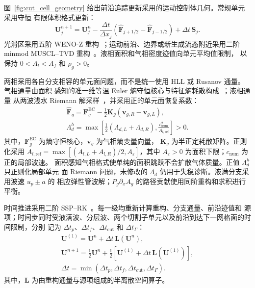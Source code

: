 图~\ref{fig:cut_cell_geometry} 给出前沿追踪更新采用的运动控制体几何。常规单元采用守恒
有限体积格式更新：
\begin{equation}
\mathbf U_j^{n+1}=\mathbf U_j^n
-\frac{\Delta t}{\Delta x_j}
\left(\widehat{\mathbf F}_{j+1/2}
-\widehat{\mathbf F}_{j-1/2}\right)
+\Delta t\,\mathbf S_j.
\label{eq:fv_update}
\end{equation}
光滑区采用五阶 WENO-Z 重构~\cite{borges2008}；运动前沿、边界或新生成流态附近采用二阶
minmod MUSCL--TVD 重构~\cite{vanleer1979}。液相面积和气相密度迹值向单元平均值限制，
以保持 $0<A_l<A_f$ 和 $\rho_g>0$。

两相采用各自分支相容的单元面问题，而不是统一使用 HLL 或 Rusanov 通量。气相通量由面积
感知的准一维等温 Euler 熵守恒核心与特征熵耗散构成~\cite{winters2020,chan2024}；液相通量
从两波浅水 Riemann 解采样~\cite{toro2001}，并采用正的单元面恢复系数：
\begin{equation}
\begin{gathered}
\widehat{\mathbf F}_g
=\mathbf F_g^{\mathrm{EC}}
-\tfrac12\mathbf K_g(\mathbf v_{g,R}-\mathbf v_{g,L}),\\[3pt]
\Lambda_{d}^{h}
=\max\!\left[
\tfrac12(\Lambda_{d,L}+\Lambda_{d,R}),
\frac{c_{\mathrm{num}}^2}{A_{l,\mathrm{ref}}}
\right]>0.
\end{gathered}
\label{eq:regular_fluxes}
\end{equation}
其中，$\mathbf F_g^{\mathrm{EC}}$ 为熵守恒核心，$\mathbf v_g$ 为气相熵变量向量，
$\mathbf K_g$ 为\mbox{半正定耗散矩阵}。正则化采用
$A_{l,\mathrm{ref}}=\max[(A_{l,L}+A_{l,R})/2,A_\varepsilon]$，其中
$A_\varepsilon>0$ 为面积下限；$c_{\mathrm{num}}$ 为正的局部波速。
\mbox{面积感知}气相格式使单纯的面积跳跃不会扩散气体质量。正值 $\Lambda_d^h$ 只正则化局部单元
面 Riemann 问题，未修改的 $\Lambda_d$ 仍用于失稳诊断。液满分支采用波速 $u_p\pm a$ 的
相应弹性管波解；$P_g\partial_xA_g$ 的路径贡献使用同阶重构和求积进行平衡。

时间推进采用二阶 SSP--RK~\cite{gottlieb2001}。每一级均重新计算重构、分支通量、前沿迹值和
源项；时间步同时受液满波、分层波、两个切割子单元以及前沿到达下一网格面的时间限制，分别
记为 $\Delta t_p$、$\Delta t_f$、$\Delta t_{\mathrm{cut}}$ 和 $\Delta t_\Gamma$：
\begin{equation}
\begin{gathered}
\mathbf U^{(1)}=\mathbf U^n+\Delta t\,\mathbf L(\mathbf U^n),\\[3pt]
\mathbf U^{n+1}=\tfrac12\mathbf U^n
+\tfrac12\left[\mathbf U^{(1)}
+\Delta t\,\mathbf L(\mathbf U^{(1)})\right],\\[3pt]
\Delta t=\min(\Delta t_p,\Delta t_f,
\Delta t_{\mathrm{cut}},\Delta t_\Gamma).
\end{gathered}
\label{eq:ssprk_cfl}
\end{equation}
其中，$\mathbf L$ 为由重构通量与源项组成的半离散空间算子。

